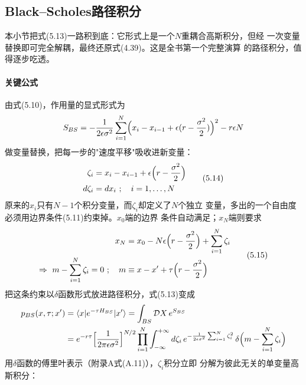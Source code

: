 \subsection{Black--Scholes路径积分}

本小节把式(5.13)一路积到底：它形式上是一个$N$重耦合高斯积分，但经
一次变量替换即可完全解耦，最终还原式(4.39)。这是全书第一个完整演算
的路径积分，值得逐步吃透。

\paragraph{关键公式}
由式(5.10)，作用量的显式形式为
\begin{equation*}
S_{BS}=-\frac{1}{2\epsilon\sigma^{2}}\sum_{i=1}^{N}
\Bigl(x_{i}-x_{i-1}+\epsilon(r-\frac{\sigma^{2}}{2})\Bigr)^{2}-r\epsilon N
\end{equation*}
做变量替换，把每一步的"速度平移"吸收进新变量：
\begin{equation*}
\begin{aligned}
\zeta_{i}&=x_{i}-x_{i-1}+\epsilon\Bigl(r-\frac{\sigma^{2}}{2}\Bigr)\\
d\zeta_{i}&=dx_{i}\ ;\quad i=1,\ldots,N
\end{aligned}
\tag{5.14}
\end{equation*}
原来的$x_{i}$只有$N-1$个积分变量，而$\zeta_{i}$却定义了$N$个独立
变量，多出的一个自由度必须用边界条件(5.11)约束掉。$x_{0}$端的边界
条件自动满足；$x_{N}$端则要求
\begin{equation*}
\begin{aligned}
x_{N}&=x_{0}-N\epsilon\Bigl(r-\frac{\sigma^{2}}{2}\Bigr)
+\sum_{i=1}^{N}\zeta_{i}\\
\Rightarrow\ m-\sum_{i=1}^{N}\zeta_{i}=0\ ;\quad
m&\equiv x-x'+\tau\Bigl(r-\frac{\sigma^{2}}{2}\Bigr)
\end{aligned}
\tag{5.15}
\end{equation*}
把这条约束以$\delta$函数形式放进路径积分，式(5.13)变成
\begin{align*}
p_{BS}(x,\tau;x')&=\langle x\vert e^{-\tau H_{BS}}\vert x'\rangle
=\int_{BS}\mathcal{D}X\,e^{S_{BS}}\\
&=e^{-r\tau}\Bigl[\frac{1}{2\pi\epsilon\sigma^{2}}\Bigr]^{N/2}
\prod_{i=1}^{N}\int_{-\infty}^{+\infty}d\zeta_{i}\,
e^{-\frac{1}{2\epsilon\sigma^{2}}\sum_{i=1}^{N}\zeta_{i}^{2}}\,
\delta\Bigl(m-\sum_{i=1}^{N}\zeta_{i}\Bigr)
\end{align*}
用$\delta$函数的傅里叶表示（附录A式(A.11)），$\zeta_{i}$积分立即
分解为彼此无关的单变量高斯积分：
